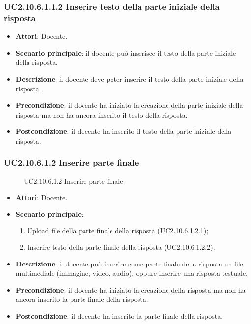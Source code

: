 \subsubsection{UC2.10.6.1.1.2 Inserire testo della parte iniziale della risposta}
\begin{itemize}
\item \textbf{Attori}: Docente.
\item \textbf{Scenario principale}: il docente può inserisce il testo della parte iniziale della risposta.
\item \textbf{Descrizione}: il docente deve poter inserire il testo della parte iniziale della risposta.
\item \textbf{Precondizione}: il docente ha iniziato la creazione della parte iniziale della risposta ma non ha ancora inserito il testo della risposta.
\item \textbf{Postcondizione}: il docente ha inserito il testo della parte iniziale della risposta.
\end{itemize}
\subsubsection{UC2.10.6.1.2 Inserire parte finale}
\begin{figure}[H]
\centering
\noindent{}
\caption{UC2.10.6.1.2 Inserire parte finale}
\end{figure}
\begin{itemize}
\item \textbf{Attori}: Docente.
\item \textbf{Scenario principale}:
\begin{enumerate}
\item Upload file della parte finale della risposta (UC2.10.6.1.2.1);
\item Inserire testo della parte finale della risposta (UC2.10.6.1.2.2).
\end{enumerate}
\item \textbf{Descrizione}: il docente può inserire come parte finale della risposta un file multimediale (immagine, video, audio), oppure inserire una risposta testuale.
\item \textbf{Precondizione}: il docente ha iniziato la creazione della risposta ma non ha ancora inserito la parte finale della risposta.
\item \textbf{Postcondizione}: il docente ha inserito la parte finale della risposta.
\end{itemize}
